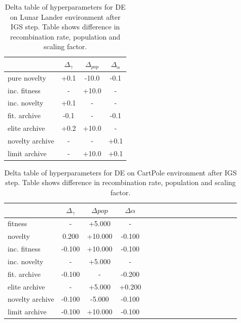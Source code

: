 \begin{table}[ht]
	\centering
	\scriptsize
	\setlength{\tabcolsep}{4pt}
	\renewcommand{\arraystretch}{1.15}
	\begin{tabular}{lccc}
		\toprule
		{} &   $\Delta_{\gamma}$ & $\Delta_{pop}$ &   $\Delta_{\alpha}$ \\
		\midrule
		pure novelty    &  +0.1 & -10.0 & -0.1 \\
		inc. fitness    &    - &  +10.0 &    - \\
		inc. novelty    &  +0.1 &     - &    - \\
		fit. archive    & -0.1 &     - & -0.1 \\
		elite archive   &  +0.2 &  +10.0 &    - \\
		novelty archive &    - &     - &  +0.1 \\
		limit archive   &    - &  +10.0 &  +0.1 \\
		\bottomrule
	\end{tabular}

	\caption{Delta table of hyperparameters for DE  on Lunar Lander environment after IGS step. Table shows difference in recombination rate, population and scaling factor.}
	\label{tab:deltaLL2}
\end{table}

\begin{table}[ht]
	\centering
	\scriptsize
	\setlength{\tabcolsep}{4pt}
	\renewcommand{\arraystretch}{1.15}
	\begin{tabular}{lcccccccccccccccc}
		\toprule
		{} &     $\Delta_{\gamma}$ &     $\Delta{pop}$ &     $\Delta{\alpha}$ \\
		\midrule
		fitness           &  - &  +5.000 &  - \\
		novelty           &  0.200 & +10.000 & -0.100 \\
		inc. fitness       & -0.100 & +10.000 & -0.100 \\
		inc. novelty       &  - &  +5.000 &  - \\
		fit. archive     & -0.100 &  - & -0.200 \\
		elite archive   &  - &  +5.000 &  +0.200 \\
		novelty archive & -0.100 & -5.000 & -0.100 \\
		limit archive     & -0.100 & +10.000 & -0.100 \\
		\bottomrule
	\end{tabular}
	
	\caption{Delta table of hyperparameters for DE on CartPole environment after IGS step. Table shows difference in recombination rate, population and scaling factor.}
	\label{tab:deltaCT1}
\end{table}

